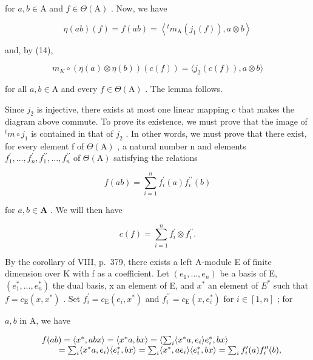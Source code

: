 for \(a, b \in \mathrm{A}\) and \(f \in \Theta(\mathrm{A})\) . Now, we have

\[
\eta (a b) (f) = f (a b) = \left\langle {} ^ {t} m _ {\mathrm{A}} \left(j _ {1} (f)\right), a \otimes b \right\rangle
\]

and, by (14),

\[
m _ {K} \circ (\eta (a) \otimes \eta (b)) (c (f)) = \langle j _ {2} (c (f)), a \otimes b \rangle
\]

for all \(a, b \in \mathrm{A}\) and every \(f \in \Theta(\mathrm{A})\) . The lemma follows.

Since \(j_{2}\) is injective, there exists at most one linear mapping c that makes the diagram above commute. To prove its existence, we must prove that the image of \(^{t}m \circ j_{1}\) is contained in that of \(j_{2}\) . In other words, we must prove that there exist, for every element f of \(\Theta(\mathrm{A})\) , a natural number n and elements \(f_{1}^{\prime}, \ldots, f_{n}^{\prime}, f_{1}^{\prime\prime}, \ldots, f_{n}^{\prime\prime}\) of \(\Theta(\mathrm{A})\) satisfying the relations

\[
f (a b) = \sum_ {i = 1} ^ {n} f _ {i} ^ {\prime} (a) f _ {i} ^ {\prime \prime} (b)\tag{16}
\]

for \(a, b \in \mathbf{A}\) . We will then have

\[
c (f) = \sum_ {i = 1} ^ {n} f _ {i} ^ {\prime} \otimes f _ {i} ^ {\prime \prime}.\tag{17}
\]

By the corollary of VIII, p.~379, there exists a left A-module E of finite dimension over K with f as a coefficient. Let \((e_{1},\ldots,e_{n})\) be a basis of E, \((e_{1}^{*},\ldots,e_{n}^{*})\) the dual basis, x an element of E, and \(x^{*}\) an element of \(E^{*}\) such that \(f=c_{\mathrm{E}}(x,x^{*})\) . Set \(f_{i}^{\prime}=c_{\mathrm{E}}(e_{i},x^{*})\) and \(f_{i}^{\prime\prime}=c_{\mathrm{E}}(x,e_{i}^{*})\) for \(i\in[1,n]\) ; for

\(a, b\) in A, we have

\[
\begin{array}{r l} & {f (a b) = \langle x ^ {*}, a b x \rangle = \langle x ^ {*} a, b x \rangle = \left\langle \sum_ {i} \langle x ^ {*} a, e _ {i} \rangle e _ {i} ^ {*}, b x \right\rangle} \\ & {\qquad = \sum_ {i} \langle x ^ {*} a, e _ {i} \rangle \langle e _ {i} ^ {*}, b x \rangle = \sum_ {i} \langle x ^ {*}, a e _ {i} \rangle \langle e _ {i} ^ {*}, b x \rangle = \sum_ {i} f _ {i} ^ {\prime} (a) f _ {i} ^ {\prime \prime} (b),} \end{array}
\]

